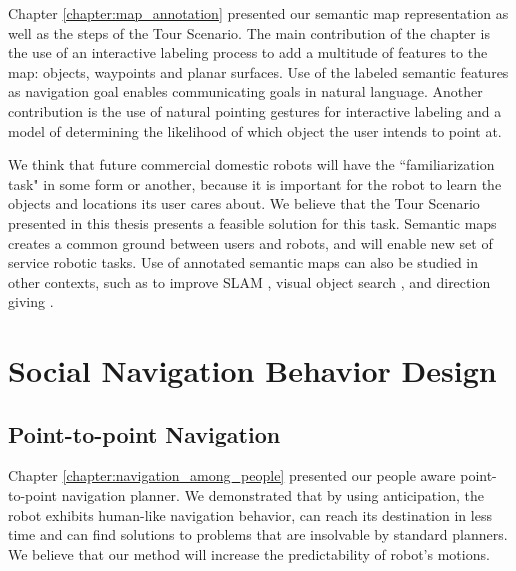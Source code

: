 Chapter \ref{chapter:map_annotation} presented our semantic map representation as well as the steps of the Tour Scenario. The main contribution of the chapter is the use of an interactive labeling process to add a multitude of features to the map: objects, waypoints and planar surfaces. Use of the labeled semantic features as navigation goal enables communicating goals in natural language. Another contribution is the use of natural pointing gestures for interactive labeling and a model of determining the likelihood of which object the user intends to point at.

We think that future commercial domestic robots will have the ``familiarization task" in some form or another, because it is important for the robot to learn the objects and locations its user cares about. We believe that the Tour Scenario presented in this thesis presents a feasible solution for this task. Semantic maps creates a common ground between users and robots, and will enable new set of service robotic tasks. Use of annotated semantic maps can also be studied in other contexts, such as to improve SLAM \cite{trevor2015semantic}, visual object search \cite{rogers2013life},  and direction giving \cite{kollar2010toward}.






\section{Social Navigation Behavior Design}


\subsection{Point-to-point Navigation}

Chapter \ref{chapter:navigation_among_people} presented our people aware point-to-point navigation planner. We demonstrated that by using anticipation, the robot exhibits human-like navigation behavior, can reach its destination in less time and can find solutions to problems that are insolvable by standard planners. We believe that our method will increase the predictability of robot’s motions.
	
